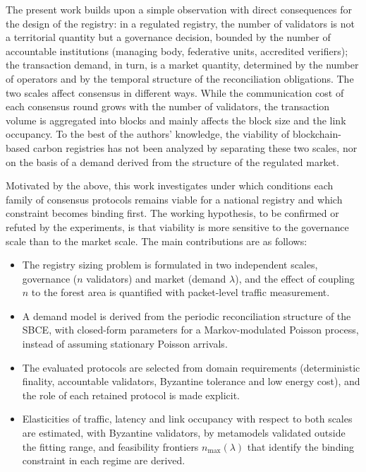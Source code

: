 \documentclass[english]{sbc2025}%
\newcommand{\nmax}{n_{\max}}
\begin{document}
The present work builds upon a simple observation with direct consequences for the design of the registry: in a regulated registry, the number of validators is not a territorial quantity but a governance decision, bounded by the number of accountable institutions (managing body, federative units, accredited verifiers); the transaction demand, in turn, is a market quantity, determined by the number of operators and by the temporal structure of the reconciliation obligations. The two scales affect consensus in different ways. While the communication cost of each consensus round grows with the number of validators, the transaction volume is aggregated into blocks and mainly affects the block size and the link occupancy. To the best of the authors' knowledge, the viability of blockchain-based carbon registries has not been analyzed by separating these two scales, nor on the basis of a demand derived from the structure of the regulated market.

Motivated by the above, this work investigates under which conditions each family of consensus protocols remains viable for a national registry and which constraint becomes binding first. The working hypothesis, to be confirmed or refuted by the experiments, is that viability is more sensitive to the governance scale than to the market scale. The main contributions are as follows:

\begin{itemize}
\item The registry sizing problem is formulated in two independent scales, governance ($n$ validators) and market (demand $\lambda$), and the effect of coupling $n$ to the forest area is quantified with packet-level traffic measurement.
\item A demand model is derived from the periodic reconciliation structure of the SBCE, with closed-form parameters for a Markov-modulated Poisson process, instead of assuming stationary Poisson arrivals.
\item The evaluated protocols are selected from domain requirements (deterministic finality, accountable validators, Byzantine tolerance and low energy cost), and the role of each retained protocol is made explicit.
\item Elasticities of traffic, latency and link occupancy with respect to both scales are estimated, with Byzantine validators, by metamodels validated outside the fitting range, and feasibility frontiers $\nmax(\lambda)$ that identify the binding constraint in each regime are derived.
\end{itemize}
\end{document}
